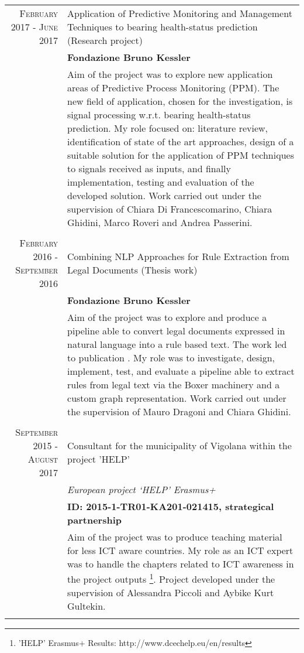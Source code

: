 \documentclass[a4paper,10pt]{article}
\begin{document}
\begin{longtable}{r|p{8.5cm}}
  \textsc{February 2017 - June 2017} & Application of Predictive Monitoring and Management Techniques to bearing health-status prediction (Research project) \\
 &\textbf{Fondazione Bruno Kessler}\\
 &\footnotesize{Aim of the project was to explore new application areas of Predictive Process Monitoring (PPM). The new field of application, chosen for the investigation, is signal processing w.r.t. bearing health-status prediction. My role focused on: literature review, identification of state of the art approaches, design of a suitable solution for the application of PPM techniques to signals received as inputs, and finally implementation, testing and evaluation of the developed solution. Work carried out under the supervision of Chiara Di Francescomarino, Chiara Ghidini, Marco Roveri and Andrea Passerini.}\\\multicolumn{2}{c}{} \\
 
 \textsc{February 2016 - September 2016} & Combining NLP Approaches for Rule Extraction from Legal Documents (Thesis work)\\
  &\textbf{Fondazione Bruno Kessler}\\
 &\footnotesize{Aim of the project was to explore and produce a pipeline able to convert legal documents expressed in natural language into a rule based text. The work led to publication \cite{dragoni2016combining}. My role was to investigate, design, implement, test, and evaluate a pipeline able to extract rules from legal text via the Boxer machinery and a custom graph representation. Work carried out under the supervision of Mauro Dragoni and Chiara Ghidini.}\\\multicolumn{2}{c}{} \\
 
  \textsc{September 2015 - August 2017} & Consultant for the municipality of Vigolana within the project 'HELP'\\
  &\emph{European project ‘HELP’ Erasmus+}\\
  &\textbf{ID: 2015-1-TR01-KA201-021415, strategical partnership }\\
 &\footnotesize{Aim of the project was to produce teaching material for less ICT aware countries. My role as an ICT expert was to handle the chapters related to ICT awareness in the project outputs \footnote{’HELP’ Erasmus+ Results: http://www.dcechelp.eu/en/results}. Project developed under the supervision of Alessandra Piccoli and Aybike Kurt Gultekin.}\\\multicolumn{2}{c}{} \\
 

\end{longtable}
\end{document}
